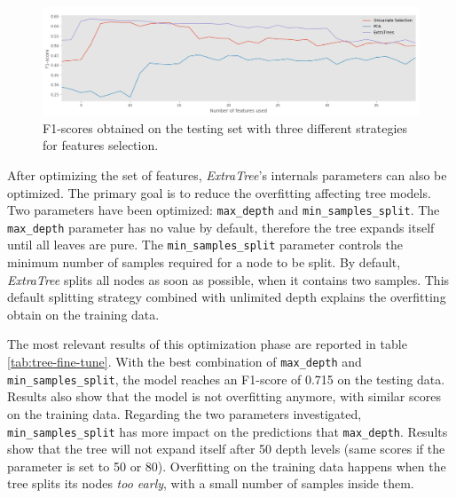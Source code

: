 \begin{figure}[htbp]
    \centering
    \includegraphics[width=15cm]{images/feature_selection.png}
    \caption[F1-scores based on feature selection]{F1-scores obtained on the testing set with three different strategies for features selection.}
    \label{fig:feature-selection}
\end{figure}


After optimizing the set of features, \textit{ExtraTree}'s internals parameters can also be optimized. The primary goal is to reduce the overfitting affecting tree models. Two parameters have been optimized: \texttt{max\_depth} and \texttt{min\_samples\_split}. The \texttt{max\_depth} parameter has no value by default, therefore the tree expands itself until all leaves are pure. The \texttt{min\_samples\_split} parameter controls the minimum number of samples required for a node to be split. By default, \textit{ExtraTree} splits all nodes as soon as possible, when it contains two samples. This default splitting strategy combined with unlimited depth explains the overfitting obtain on the training data.

The most relevant results of this optimization phase are reported in table \ref{tab:tree-fine-tune}. With the best combination of \texttt{max\_depth} and \texttt{min\_samples\_split}, the model reaches an F1-score of 0.715 on the testing data. Results also show that the model is not overfitting anymore, with similar scores on the training data. Regarding the two parameters investigated, \texttt{min\_samples\_split} has more impact on the predictions that \texttt{max\_depth}. Results show that the tree will not expand itself after 50 depth levels (same scores if the parameter is set to 50 or 80). Overfitting on the training data happens when the tree splits its nodes \textit{too early}, with a small number of samples inside them.


